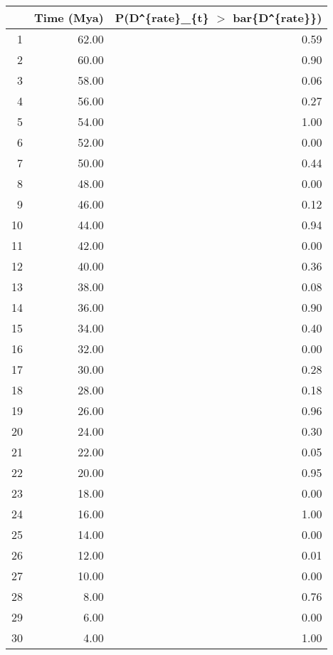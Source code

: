 \begin{table}[ht]
\centering
\begin{tabular}{rrr}
  \hline
 & Time (Mya) & P(D\verb|^|\{rate\}\_\{t\} $>$ bar\{D\verb|^|\{rate\}\}) \\ 
  \hline
1 & 62.00 & 0.59 \\ 
  2 & 60.00 & 0.90 \\ 
  3 & 58.00 & 0.06 \\ 
  4 & 56.00 & 0.27 \\ 
  5 & 54.00 & 1.00 \\ 
  6 & 52.00 & 0.00 \\ 
  7 & 50.00 & 0.44 \\ 
  8 & 48.00 & 0.00 \\ 
  9 & 46.00 & 0.12 \\ 
  10 & 44.00 & 0.94 \\ 
  11 & 42.00 & 0.00 \\ 
  12 & 40.00 & 0.36 \\ 
  13 & 38.00 & 0.08 \\ 
  14 & 36.00 & 0.90 \\ 
  15 & 34.00 & 0.40 \\ 
  16 & 32.00 & 0.00 \\ 
  17 & 30.00 & 0.28 \\ 
  18 & 28.00 & 0.18 \\ 
  19 & 26.00 & 0.96 \\ 
  20 & 24.00 & 0.30 \\ 
  21 & 22.00 & 0.05 \\ 
  22 & 20.00 & 0.95 \\ 
  23 & 18.00 & 0.00 \\ 
  24 & 16.00 & 1.00 \\ 
  25 & 14.00 & 0.00 \\ 
  26 & 12.00 & 0.01 \\ 
  27 & 10.00 & 0.00 \\ 
  28 & 8.00 & 0.76 \\ 
  29 & 6.00 & 0.00 \\ 
  30 & 4.00 & 1.00 \\ 
   \hline
\end{tabular}
\label{tab:rate_peak}
\end{table}
